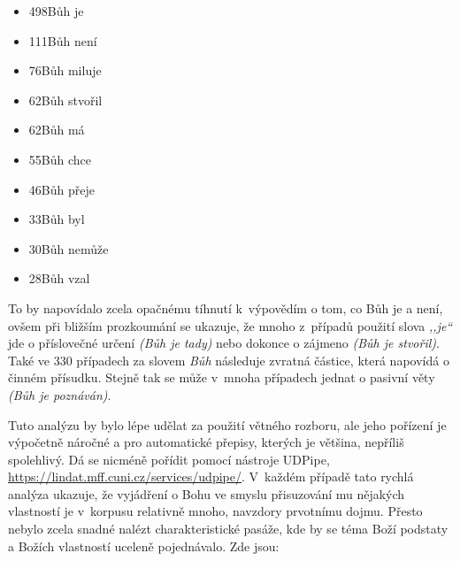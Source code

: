 \begin{itemize}
\item{498\texttimes Bůh je}
\item{111\texttimes Bůh není}
\item{ 76\texttimes Bůh miluje}
\item{ 62\texttimes Bůh stvořil}
\item{ 62\texttimes Bůh má}
\item{ 55\texttimes Bůh chce}
\item{ 46\texttimes Bůh přeje}
\item{ 33\texttimes Bůh byl}
\item{ 30\texttimes Bůh nemůže}
\item{ 28\texttimes Bůh vzal}
\end{itemize}

To by napovídalo zcela opačnému tíhnutí k~výpovědím o tom, co Bůh je a není,
ovšem při bližším prozkoumání se ukazuje, že mnoho z~případů použití slova
\textit{,,je``} jde o příslovečné určení \textit{(Bůh je tady)} nebo dokonce o
zájmeno \textit{(Bůh je stvořil)}. Také ve 330 případech za slovem \textit{Bůh}
následuje zvratná částice, která napovídá o činném přísudku. Stejně tak se může
v~mnoha případech jednat o pasivní věty \textit{(Bůh je poznáván)}.

Tuto analýzu by bylo lépe udělat za použití větného rozboru, ale jeho pořízení
je výpočetně náročné a pro automatické přepisy, kterých je většina, nepříliš
spolehlivý. Dá se nicméně pořídit pomocí nástroje UDPipe\cite{udpipe},
\url{https://lindat.mff.cuni.cz/services/udpipe/}. V~každém případě tato rychlá
analýza ukazuje, že vyjádření o Bohu ve smyslu přisuzování mu nějakých
vlastností je v~korpusu relativně mnoho, navzdory prvotnímu dojmu. Přesto nebylo
zcela snadné nalézt charakteristické pasáže, kde by se téma Boží podstaty a Božích
vlastností uceleně pojednávalo. Zde jsou:

